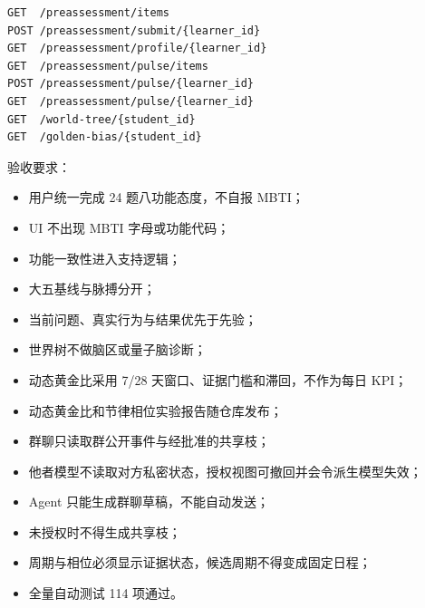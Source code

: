 \documentclass[UTF8,a4paper,11pt]{ctexart}
\begin{document}
\begin{verbatim}
GET  /preassessment/items
POST /preassessment/submit/{learner_id}
GET  /preassessment/profile/{learner_id}
GET  /preassessment/pulse/items
POST /preassessment/pulse/{learner_id}
GET  /preassessment/pulse/{learner_id}
GET  /world-tree/{student_id}
GET  /golden-bias/{student_id}
\end{verbatim}

验收要求：

\begin{itemize}
\item 用户统一完成 24 题八功能态度，不自报 MBTI；
\item UI 不出现 MBTI 字母或功能代码；
\item 功能一致性进入支持逻辑；
\item 大五基线与脉搏分开；
\item 当前问题、真实行为与结果优先于先验；
\item 世界树不做脑区或量子脑诊断；
\item 动态黄金比采用 7/28 天窗口、证据门槛和滞回，不作为每日 KPI；
\item 动态黄金比和节律相位实验报告随仓库发布；
\item 群聊只读取群公开事件与经批准的共享枝；
\item 他者模型不读取对方私密状态，授权视图可撤回并会令派生模型失效；
\item Agent 只能生成群聊草稿，不能自动发送；
\item 未授权时不得生成共享枝；
\item 周期与相位必须显示证据状态，候选周期不得变成固定日程；
\item 全量自动测试 114 项通过。
\end{itemize}
\end{document}
